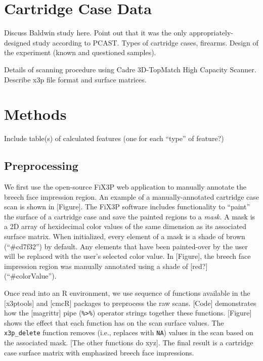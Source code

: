 \documentclass[
]{jdssv}
\begin{document}
\hypertarget{cartridge-case-data}{%
\section{Cartridge Case Data}\label{cartridge-case-data}}

Discuss Baldwin study here. Point out that it was the only
appropriately-designed study according to PCAST. Types of cartridge
cases, firearms. Design of the experiment (known and questioned
samples).

Details of scanning procedure using Cadre 3D-TopMatch High Capacity
Scanner. Describe x3p file format and surface matrices.

\hypertarget{methods}{%
\section{Methods}\label{methods}}

Include table(s) of calculated features (one for each ``type'' of
feature?)

\hypertarget{preprocessing}{%
\subsection{Preprocessing}\label{preprocessing}}

We first use the open-source FiX3P web application to manually annotate
the breech face impression region. An example of a manually-annotated
cartridge case scan is shown in {[}Figure{]}. The FiX3P software
includes functionality to ``paint'' the surface of a cartridge case and
save the painted regions to a \emph{mask.} A mask is a 2D array of
hexidecimal color values of the same dimension as its associated surface
matrix. When initialized, every element of a mask is a shade of brown
(``\#cd7f32'') by default. Any elements that have been painted-over by
the user will be replaced with the user's selected color value. In
{[}Figure{]}, the breech face impression region was manually annotated
using a shade of {[}red?{]} (``\#colorValue'').

Once read into an R environment, we use sequence of functions available
in the {[}x3ptools{]} and {[}cmcR{]} packages to preprocess the raw
scans. {[}Code{]} demonstrates how the {[}magrittr{]} pipe
(\texttt{\%\textgreater{}\%}) operator strings together these functions.
{[}Figure{]} shows the effect that each function has on the scan surface
values. The \texttt{x3p\_delete} function removes (i.e., replaces with
\texttt{NA}) values in the scan based on the associated mask. {[}The
other functions do xyz{]}. The final result is a cartridge case surface
matrix with emphasized breech face impressions.
\end{document}
